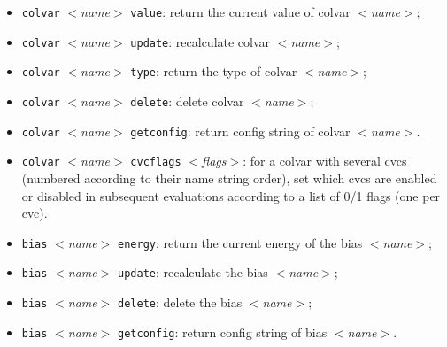 \begin{itemize}
\item \texttt{colvar} \emph{$<$name$>$} \texttt{value}: return the current value of colvar \emph{$<$name$>$};
\item \texttt{colvar} \emph{$<$name$>$} \texttt{update}: recalculate colvar \emph{$<$name$>$};
\item \texttt{colvar} \emph{$<$name$>$} \texttt{type}: return the type of colvar \emph{$<$name$>$};
\item \texttt{colvar} \emph{$<$name$>$} \texttt{delete}: delete colvar \emph{$<$name$>$};
\item \texttt{colvar} \emph{$<$name$>$} \texttt{getconfig}: return config string of colvar \emph{$<$name$>$}.
\item \texttt{colvar} \emph{$<$name$>$} \texttt{cvcflags} \emph{$<$flags$>$}: for a colvar with several cvcs (numbered according to their name
string order), set which cvcs are enabled or disabled in subsequent evaluations according to a list of 0/1 flags (one per cvc).
\end{itemize}


\begin{itemize}
\item \texttt{bias} \emph{$<$name$>$} \texttt{energy}: return the current energy of the bias \emph{$<$name$>$};
\item \texttt{bias} \emph{$<$name$>$} \texttt{update}: recalculate the bias \emph{$<$name$>$};
\item \texttt{bias} \emph{$<$name$>$} \texttt{delete}: delete the bias \emph{$<$name$>$};
\item \texttt{bias} \emph{$<$name$>$} \texttt{getconfig}: return config string of bias \emph{$<$name$>$}.
\end{itemize}

